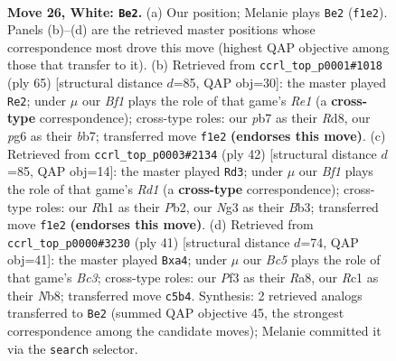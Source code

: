 \documentclass[11pt]{article}
\begin{document}
\clearpage

\begin{figure}[p]\centering
\begin{subfigure}{0.46\textwidth}\centering
\resizebox{\linewidth}{!}{%
\newchessgame
\chessboard[
  setfen={r4kr1/1p1bbp1p/p5p1/2Bp4/8/3K1PN1/PP4PP/2R2B1R w - - 1 26},
  showmover=false,
  pgfstyle=straightmove, color=movearrow, markmove={f1-e2}
]}
\caption{}
\end{subfigure}\hfill
\begin{subfigure}{0.46\textwidth}\centering
\resizebox{\linewidth}{!}{%
\newchessgame
\chessboard[
  setfen={3rr1k1/pB3p2/6p1/2p3P1/1n1b1B1P/1P5R/P4PK1/3R4 b - - 0 33},
  showmover=false,
  pgfstyle=straightmove, color=movearrow, markmove={e8-e2}
]}
\caption{}
\end{subfigure}
\\[4pt]
\begin{subfigure}{0.46\textwidth}\centering
\resizebox{\linewidth}{!}{%
\newchessgame
\chessboard[
  setfen={r4bk1/2r2p2/1np3pp/p1N1p3/4P3/1B3P1P/PP3P2/2RR2K1 w - - 0 22},
  showmover=false,
  pgfstyle=straightmove, color=movearrow, markmove={d1-d3}
]}
\caption{}
\end{subfigure}\hfill
\begin{subfigure}{0.46\textwidth}\centering
\resizebox{\linewidth}{!}{%
\newchessgame
\chessboard[
  setfen={rnk4r/5ppp/p1b1p3/8/BB6/1P6/P4PPP/3RK2R b K - 0 21},
  showmover=false,
  pgfstyle=straightmove, color=movearrow, markmove={c6-a4}
]}
\caption{}
\end{subfigure}
\caption{\textbf{Move 26, White: \texttt{Be2}.} (a) Our position; Melanie plays \texttt{Be2} (\texttt{f1e2}). Panels (b)--(d) are the retrieved master positions whose correspondence most drove this move (highest QAP objective among those that transfer to it). (b) Retrieved from \texttt{ccrl\_top\_p0001\#1018} (ply 65) [structural distance $d$=85, QAP obj=30]: the master played \texttt{Re2}; under $\mu$ our \emph{Bf1} plays the role of that game's \emph{Re1} (a \textbf{cross-type} correspondence); cross-type roles: our \emph{p}b7 as their \emph{R}d8, our \emph{p}g6 as their \emph{b}b7; transferred move \texttt{f1e2} \textbf{(endorses this move)}. (c) Retrieved from \texttt{ccrl\_top\_p0003\#2134} (ply 42) [structural distance $d$=85, QAP obj=14]: the master played \texttt{Rd3}; under $\mu$ our \emph{Bf1} plays the role of that game's \emph{Rd1} (a \textbf{cross-type} correspondence); cross-type roles: our \emph{R}h1 as their \emph{P}b2, our \emph{N}g3 as their \emph{B}b3; transferred move \texttt{f1e2} \textbf{(endorses this move)}. (d) Retrieved from \texttt{ccrl\_top\_p0000\#3230} (ply 41) [structural distance $d$=74, QAP obj=41]: the master played \texttt{Bxa4}; under $\mu$ our \emph{Bc5} plays the role of that game's \emph{Bc3}; cross-type roles: our \emph{P}f3 as their \emph{R}a8, our \emph{R}c1 as their \emph{N}b8; transferred move \texttt{c5b4}. Synthesis: 2 retrieved analogs transferred to \texttt{Be2} (summed QAP objective 45, the strongest correspondence among the candidate moves); Melanie committed it via the \texttt{search} selector.}
\label{fig:thought-m50}
\end{figure}
\end{document}
